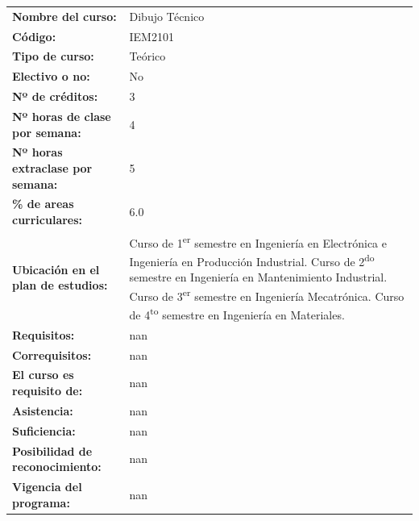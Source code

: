 \documentclass[letterpaper]{article}%
\begin{document}
\begin{longtable}{m{7cm}m{9cm}}%
\textbf{Nombre del curso:}&Dibujo Técnico\\%
\textbf{Código:}&IEM2101\\%
\textbf{Tipo de curso:}&Teórico\\%
\textbf{Electivo o no:}&No\\%
\textbf{Nº de créditos:}&3\\%
\textbf{Nº horas de clase por semana:}&4\\%
\textbf{Nº horas extraclase por semana:}&5\\%
\textbf{\% de areas curriculares:}&6.0\\%
\textbf{Ubicación en el plan de estudios:}&Curso de 1\textsuperscript{er} semestre en Ingeniería en Electrónica e Ingeniería en Producción Industrial. Curso de 2\textsuperscript{do} semestre en Ingeniería en Mantenimiento Industrial. Curso de 3\textsuperscript{er} semestre en Ingeniería Mecatrónica. Curso de 4\textsuperscript{to} semestre en Ingeniería en Materiales. \\%
\textbf{Requisitos:}&nan\\%
\textbf{Correquisitos:}&nan\\%
\textbf{El curso es requisito de:}&nan\\%
\textbf{Asistencia:}&nan\\%
\textbf{Suficiencia:}&nan\\%
\textbf{Posibilidad de reconocimiento:}&nan\\%
\textbf{Vigencia del programa:}&nan\\%
\end{longtable}%
\newpage%
\renewcommand{\arraystretch}{1.5}%
\end{document}
